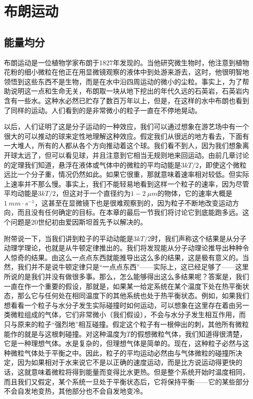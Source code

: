\chapter{布朗运动}

\section{能量均分}

布朗运动是一位植物学家布朗于1827年发现的。当他研究微生物时，他注意到植物花粉的细小微粒在他正在用显微镜观察的液体中到处游来游去，这时，他很明智地领悟到这些东西不是生物，而是在水中沿四周运动的微小的尘粒。事实上，为了帮助说明这一点和生命无关，布朗取一块从地下挖出的年代久远的石英岩，石英岩内含有一些水。这种水必然已贮存了数百万年以上，但是，在这样的水中布朗也看到了同样的运动。人们看到的是非常微小的粒子一直在不停地晃动。

以后，人们证明了这是分子运动的一种效应，我们可以通过想象在游艺场中有一个很大的可以推动的球来定性地理解这种效应。假定我们从很远的地方看去，下面有一大堆人，所有的人都从各个方向推动着这个球。我们看不到人，因为我们想象离开球太远了，但可以看见球，并且注意到它相当无规则地来回运动。由前几章讨论的定理我们知道，悬浮在液体或气体中的微粒的平均动能是$3kT/2$，即使这个微粒远比一个分子重，情况仍然如此。如果它很重，那就意味着速率相对较低。但实际上速率并不那么慢。事实上，我们不能轻易地看到这样一个粒子的速率，因为尽管平均动能是$3kT/2$，但这对于一个直径约为$1-2~\mu m$的物体，它的速率大概是$1~mm\cdot s^{-1}$，这甚至在显微镜下也是很难观察到的，因为粒子不断地改变运动方向，而且没有任何确定的目标。在本章的最后一节我们将讨论它到底能跑多远。这个问题是20世纪初由爱因斯坦首先予以解决的。

附带说一下，当我们讲到粒子的平动动能是$3kT/2$时，我们声称这个结果是从分子动理学理论，也就是从牛顿定律推出的。我们将发现能从分子动理论推导出种种令人惊奇的结果。由这么一点点东西就能推导出这么多的结果，这是极有意义的。当然，我们并不是说牛顿定律只是“一点点东西”——实际上，这已经足够了——这里所说的是我们并没有做很多事。那么，怎么能够得出这么多结果呢？答案是，我们一直在作一个重要的假设，那就是，如果某一给定系统在某个温度下处在热平衡状态，那么它与任何处在相同温度下的其他系统也处于热平衡状态。例如，如果我们想看看一个粒子与水分子发生实际碰撞时如何运动，可以想象在这里存在着由另一类微粒组成的气体，它们非常微小（我们假设），不会与水分子发生相互作用，而只与原来的粒子“强烈地”相互碰撞。假定这个粒子有一根伸出的刺，其他所有微粒能作的就是与这根刺碰撞。对这种温度为$T$的假想微粒气体，我们知道得很清楚，它是一种理想气体。水是复杂的，但理想气体是简单的。现在，这种粒子必然与这种微粒气体处于平衡之中。因此，粒子的平均运动必然由与气体微粒的碰撞所决定，因为如果相对于水来说它不是以正确的速度运动，而是比方说运动得更快的话，这就意味着微粒将得到能量而变得比水更热。但是整个系统开始时温度相同，而且我们又假定，某个系统一旦处于平衡状态后，它将保持平衡——它的某些部分不会自发地变热，其他部分也不会自发地变冷。

